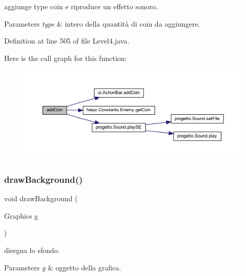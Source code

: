 aggiunge \textquotesingle{}type\textquotesingle{} coin e riproduce un effetto sonoro. 


\begin{DoxyParams}{Parameters}
{\em type} & intero della quantità di coin da aggiungere. \\
\hline
\end{DoxyParams}


Definition at line 505 of file Level4.\+java.

Here is the call graph for this function\+:\nopagebreak
\begin{figure}[H]
\begin{center}
\leavevmode
\includegraphics[width=350pt]{classscenes_1_1_level4_a9f0f7dc28e596d2ebcd06e27ef05d9fd_cgraph}
\end{center}
\end{figure}
\mbox{\label{classscenes_1_1_level4_a62bcb07be9e39896e5837a9d396e7235}} 
\subsubsection{\texorpdfstring{draw\+Background()}{drawBackground()}}
{\footnotesize\ttfamily void draw\+Background (\begin{DoxyParamCaption}\item[{Graphics}]{g }\end{DoxyParamCaption})\hspace{0.3cm}{\ttfamily [private]}}



disegna lo sfondo. 


\begin{DoxyParams}{Parameters}
{\em g} & oggetto della grafica. \\
\hline
\end{DoxyParams}


